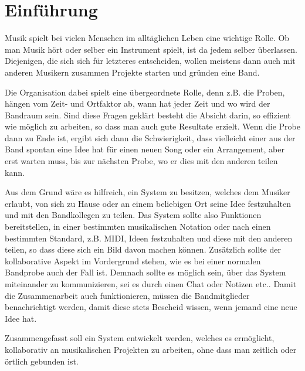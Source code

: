 \documentclass[12pt]{scrartcl}
\begin{document}



\tableofcontents

\newpage


\section{Einführung}


Musik spielt bei vielen Menschen im alltäglichen Leben eine wichtige Rolle. Ob man Musik hört oder selber ein Instrument spielt, ist da jedem selber überlassen. Diejenigen, die sich sich für letzteres entscheiden, wollen meistens dann auch mit anderen Musikern zusammen Projekte starten und gründen eine Band.

Die Organisation dabei spielt eine übergeordnete Rolle, denn z.B. die Proben, hängen vom Zeit- und Ortfaktor ab, wann hat jeder Zeit und wo wird der Bandraum sein. Sind diese Fragen geklärt besteht die Absicht darin, so effizient wie möglich zu arbeiten, so dass man auch gute Resultate erzielt. 
Wenn die Probe dann zu Ende ist, ergibt sich dann die Schwierigkeit, dass vielleicht einer aus der Band spontan eine Idee hat für einen neuen Song oder ein Arrangement, aber erst warten muss, bis zur nächsten Probe, wo er dies mit den anderen teilen kann.

Aus dem Grund wäre es hilfreich, ein System zu besitzen, welches dem Musiker erlaubt, von sich zu Hause oder an einem beliebigen Ort seine Idee festzuhalten und mit den Bandkollegen zu teilen. Das System sollte also Funktionen bereitstellen, in einer bestimmten musikalischen Notation oder nach einen bestimmten Standard, z.B. MIDI, Ideen festzuhalten und diese mit den anderen teilen, so dass diese sich ein Bild davon machen können. Zusätzlich sollte der kollaborative Aspekt im Vordergrund stehen, wie es bei einer normalen Bandprobe auch der Fall ist. Demnach sollte es möglich sein, über das System miteinander zu kommunizieren, sei es durch einen Chat oder Notizen etc.. Damit die Zusammenarbeit auch funktionieren, müssen die Bandmitglieder benachrichtigt werden, damit diese stets Bescheid wissen, wenn jemand eine neue Idee hat.

Zusammengefasst soll ein System entwickelt werden, welches es ermöglicht, kollaborativ an musikalischen Projekten zu arbeiten, ohne dass man zeitlich oder örtlich gebunden ist.
\end{document}
